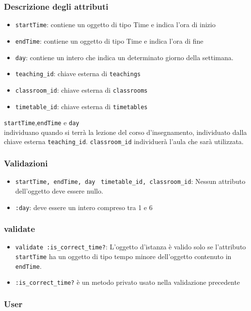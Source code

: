 \documentclass[11pt,a4paper]{article}
\begin{document}
\subsubsection*{Descrizione degli attributi}
\begin{itemize}
 \item \verb|startTime|: contiene un oggetto di tipo Time e indica l'ora di inizio
 \item \verb|endTime|: contiene un oggetto di tipo Time e indica l'ora di fine
 \item \verb|day|: contiene un intero che indica un determinato giorno della settimana.
 \item \verb|teaching_id|: chiave esterna di \verb|teachings|
 \item \verb|classroom_id|: chiave esterna di \verb|classrooms|
 \item \verb|timetable_id|: chiave esterna di \verb|timetables|
\end{itemize}
\verb|startTime|,\verb|endTime| e \verb|day|\\ individuano quando si terrà la lezione del corso d'insegnamento, individuato dalla chiave esterna \verb|teaching_id|. \verb|classroom_id| individuerà l'aula che sarà utilizzata.
\subsubsection*{Validazioni}
\begin{itemize}
 \item \verb|startTime, endTime, day | \verb|timetable_id, classroom_id|: Nessun attributo dell'oggetto deve essere nullo.
 \item \verb|:day|: deve essere un intero compreso tra 1 e 6
\end{itemize}
\subsubsection*{validate}
\begin{itemize}
\item \verb|validate :is_correct_time?|: L'oggetto d'istanza è valido solo se l'attributo \verb|startTime| ha un oggetto di tipo tempo minore dell'oggetto contenuto in \verb|endTime|.
\item \verb|:is_correct_time?| è un metodo privato usato nella validazione precedente
\end{itemize}
\subsubsection{User}
\end{document}
